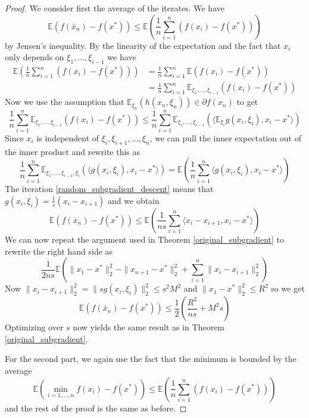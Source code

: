 \begin{proof}
 We consider first the average of the iterates. We have
 \begin{equation}
  \mathbb{E}(f(\bar{x}_n) - f(x^*)) \leq \mathbb{E}\left(\frac{1}{n}\displaystyle\sum_{i = 1}^n (f(x_i) - f(x^*))\right)
 \end{equation}
 by Jensen's inequality. By the linearity of the expectation and the fact that $x_i$ only depends on $\xi_1,...,\xi_{i-1}$
 we have
 \begin{align}
  \mathbb{E}\left(\frac{1}{n}\displaystyle\sum_{i = 1}^n (f(x_i) - f(x^*))\right)& = \frac{1}{n}\displaystyle\sum_{i = 1}^n \mathbb{E}(f(x_i) - f(x^*)) \\
   & = \frac{1}{n}\displaystyle\sum_{i = 1}^n \mathbb{E}_{\xi_1,...,\xi_{i-1}}(f(x_i) - f(x^*))
   \end{align}
 Now we use the assumption that $\mathbb{E}_{\xi_n}(h(x_n,\xi_n))\in \partial f(x_n)$ to get
 $$
  \frac{1}{n}\displaystyle\sum_{i = 1}^n \mathbb{E}_{\xi_1,...,\xi_{i-1}}(f(x_i) - f(x^*)) \leq \frac{1}{n}\displaystyle\sum_{i = 1}^n \mathbb{E}_{\xi_1,...,\xi_{i-1}}(\langle \mathbb{E}_{\xi_i}g(x_i,\xi_i),x_i - x^*\rangle)
 $$
 Since $x_i$ is independent of $\xi_i,\xi_{i+1},...,\xi_n$, we can pull the inner expectation out of the inner product and
 rewrite this as
 \begin{equation}
  \frac{1}{n}\displaystyle\sum_{i = 1}^n \mathbb{E}_{\xi_1,...,\xi_{i-1},\xi_i}(\langle g(x_i,\xi_i),x_i - x^*\rangle) = 
  \mathbb{E}\left(\frac{1}{n}\displaystyle\sum_{i = 1}^n \langle g(x_i,\xi_i),x_i - x^*\rangle\right)
 \end{equation}
 The iteration \ref{random_subgradient_descent} means that $g(x_i,\xi_i) = \frac{1}{s}(x_i - x_{i+1})$ and we obtain
 \begin{equation}
  \mathbb{E}(f(\bar{x}_n) - f(x^*)) \leq \mathbb{E}\left(\frac{1}{ns}\displaystyle\sum_{i = 1}^n \langle x_i - x_{i+1},x_i - x^*\rangle\right)
 \end{equation}
 We can now repeat the argument used in Theorem \ref{original_subgradient} to rewrite the right hand side as
 \begin{equation}
  \frac{1}{2ns}\mathbb{E}\left(\|x_1 - x^*\|^2_2 - \|x_{n+1} - x^*\|^2_2 + \displaystyle\sum_{i = 1}^n \|x_i - x_{i+1}\|_2^2\right)
 \end{equation}
 Now $\|x_i - x_{i+1}\|_2^2 = \|sg(x_i,\xi_i)\|_2^2 \leq s^2M^2$ and $\|x_1 - x^*\|_2^2 \leq R^2$ so we get
 \begin{equation}
  \mathbb{E}(f(\bar{x}_n) - f(x^*)) \leq \frac{1}{2}\left(\frac{R^2}{ns} + M^2s\right)
 \end{equation}
 Optimizing over $s$ now yields the same result as in Theorem \ref{original_subgradient}.

 For the second part, we again use the fact that the minimum is bounded by the average
 \begin{equation}
  \mathbb{E}\left(\min_{i=1,...,n} f(x_i) - f(x^*)\right) \leq \mathbb{E}\left(\frac{1}{n}\displaystyle\sum_{i = 1}^n (f(x_i) - f(x^*))\right)
 \end{equation}
 and the rest of the proof is the same as before.
 
\end{proof}

